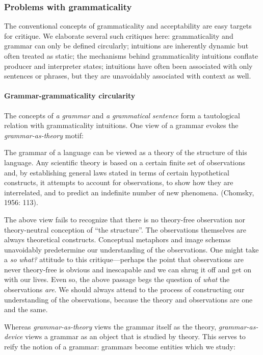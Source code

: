 \subsubsection{Problems with grammaticality}

The conventional concepts of grammaticality and acceptability are easy targets for critique. We elaborate several such critiques here: grammaticality and grammar can only be defined circularly; intuitions are inherently dynamic but often treated as static; the mechanisms behind grammaticality intuitions conflate producer and interpreter states; intuitions have often been associated with only sentences or phrases, but they are unavoidably associated with context as well.

\paragraph{Grammar-grammaticality circularity}

The concepts of \textit{a} \textit{grammar} and \textit{a} \textit{grammatical} \textit{sentence} form a tautological relation with grammaticality intuitions. One view of a grammar evokes the \textit{grammar-as-theory} motif:

The grammar of a language can be viewed as a theory of the structure of this language. Any scientific theory is based on a certain finite set of observations and, by establishing general laws stated in terms of certain hypothetical constructs, it attempts to account for observations, to show how they are interrelated, and to predict an indefinite number of new phenomena. (Chomsky, 1956: 113).

  The above view fails to recognize that there is no theory-free observation nor theory-neutral conception of “the structure”. The observations themselves are always theoretical constructs. Conceptual metaphors and image schemas unavoidably predetermine our understanding of the observations. One might take a \textit{so} \textit{what?} attitude to this critique—perhaps the point that observations are never theory-free is obvious and inescapable and we can shrug it off and get on with our lives. Even so, the above passage begs the question of \textit{what} the observations \textit{are}. We should always attend to the process of constructing our understanding of the observations, because the theory and observations are one and the same.

  Whereas \textit{grammar-as-theory} views the grammar itself as the theory, \textit{grammar-as-device} views a grammar as an object that is studied by theory. This serves to reify the notion of a grammar: grammars become entities which we study:

